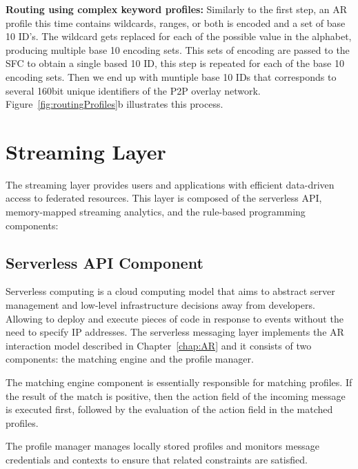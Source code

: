 \textbf{Routing using complex keyword profiles:} Similarly to the first step, an AR profile this time contains wildcards, ranges, or both is encoded and a set of base 10 ID's. The wildcard gets replaced for each of the possible value in the alphabet, producing multiple base 10 encoding sets. This sets of encoding are passed to the SFC to obtain a single based 10 ID, this step is repeated for each of the base 10 encoding sets. Then we end up with muntiple base 10 IDs that corresponds to several 160bit unique identifiers of the P2P overlay network. Figure~\ref{fig:routingProfiles}b illustrates this process.


\section{Streaming Layer}

The streaming layer provides users and applications with efficient data-driven access to federated resources. This layer is composed of the serverless API, memory-mapped streaming analytics, and the rule-based programming components:

\subsection{Serverless API Component}\label{sec:serverless}

Serverless computing is a cloud computing model that aims to abstract server management and low-level infrastructure decisions away from developers. Allowing to deploy and execute pieces of code in response to events without the need to specify IP addresses. The serverless messaging layer implements the AR interaction model described in Chapter~\ref{chap:AR} and it consists of two components: the matching engine and the profile manager. 

The matching engine component is essentially responsible for matching profiles. If the result of the match is positive, then the action field of the incoming message is executed first, followed by the evaluation of the action field in the matched profiles. 

The profile manager manages locally stored profiles and monitors message credentials and contexts to ensure that related constraints are satisfied.


